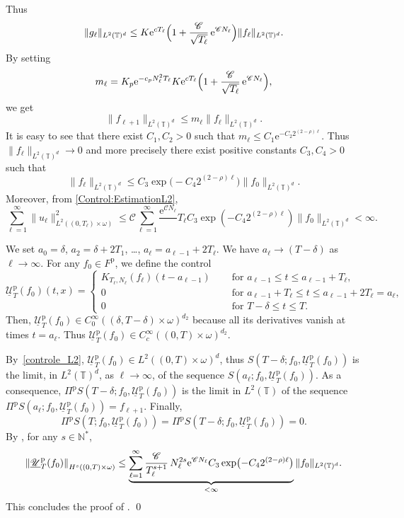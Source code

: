 \documentclass[JEP,XML,SOM,Unicode,NoEqCountersInSection]{cedram}
\let\mathcal\mathscr
\theoremstyle{plain}
\theoremstyle{definition}
\theoremstyle{remark}
\newcommand{\set}{\mathbb}
\newcommand{\T}{\set{T}}
\newcommand{\p}{{\mathrm p}}
\newcommand{\eu}{\mathrm e}
\let\originalleft\left
\let\originalright\right
\renewcommand{\left}{\mathopen{}\mathclose\bgroup\originalleft}
\renewcommand{\right}{\aftergroup\egroup\originalright}
\begin{document}
Thus
\[
\|g_\ell\|_{L^2(\T)^d} \leq K \eu^{cT_\ell} \Bigl(1 + \frac{\mathcal{C}}{\sqrt{T_\ell}}\, \eu^{\mathcal{C} N_\ell}\Bigr)
\|f_\ell\|_{L^2(\T)^d}.
\]
By setting
\[
m_\ell = K_p \eu^{- c_p N_\ell^2 T_\ell} K \eu^{cT_\ell} \Bigl(1 + \frac{\mathcal{C}}{\sqrt{T_\ell}}\, \eu^{\mathcal{C} N_\ell}\Bigr),
\]
we get
\[
\|f_{\ell+1}\|_{L^2(\T)^d} \leq m_\ell \|f_\ell \|_{L^2(\T)^d}.
\]
It is easy to see that there exist $C_1, C_2>0$ such that $m_\ell \leq C_1 \eu^{-C_2 2^{(2-\rho)\ell}}$. Thus $\|f_\ell\|_{L^2(\T)^d} \to 0$ and more precisely there exist positive constants $C_3, C_4>0$ such that
\[
\|f_\ell\|_{L^2(\T)^d} \leq C_3 \exp \bigl(-C_4 2^{(2-\rho)\ell} \bigr) \|f_0\|_{L^2(\T)^d}.
\]
Moreover, from \eqref{Control:EstimationL2},
\begin{equation}\label{controle_L2}
\sum_{\ell=1}^\infty \| u_\ell \|_{L^2((0,T_\ell)\times\omega)}^2 \leq
\mathcal{C} \sum_{\ell=1}^\infty \frac{\eu^{\mathcal{C}N_\ell}}\,{T_\ell} C_3 \exp(-C_4 2^{(2-\rho)\ell}) \|f_0\|_{L^2(\T)^d} <\infty.
\end{equation}

We set $a_0=\delta$, $a_2=\delta+2T_1$, \ldots, $a_\ell=a_{\ell-1}+2T_\ell$. We have $a_\ell \to (T-\delta)$ as $\ell \to \infty$. For any $f_0 \in F^\p$, we define the control
\[
\underline{\mathcal{U}}_T^{\p}(f_0)(t,x)=\begin{cases}
K_{T_\ell,N_\ell}(f_\ell)(t-a_{\ell-1})\quad & \text{ for } a_{\ell-1}\leq t \leq a_{\ell-1}+T_\ell, \\
0 & \text{ for } a_{\ell-1}+T_\ell\leq t \leq a_{\ell-1}+2T_\ell=a_{\ell},
\\
0 & \text{ for } T-\delta \leq t \leq T.
\end{cases}
\]
Then, $\underline{\mathcal{U}}_T^{\p}(f_0) \in C^\infty_0((\delta,T-\delta)\times \omega)^{d_2}$ because all its derivatives vanish at times $t=a_\ell$. Thus $\underline{\mathcal{U}}_T^{\p}(f_0) \in C^\infty_c((0,T)\times\omega)^{d_2}$.

By~\eqref{controle_L2}, $\underline{\mathcal{U}}_T^{\p}(f_0) \in L^2((0,T)\times\omega)^d$, thus
$S(T-\delta;f_0,\underline{\mathcal{U}}_T^{\p}(f_0))$ is the limit, in $L^2(\T)^d$, as $\ell \to \infty$, of the sequence $S(a_\ell;f_0,\underline{\mathcal{U}}_T^{\p}(f_0))$. As a consequence,
\hbox{$\Pi^\p S(T-\delta;f_0,\underline{\mathcal{U}}_T^{\p}(f_0))$} is the limit in $L^2(\T)$ of the sequence $\Pi^\p S(a_\ell;f_0,\underline{\mathcal{U}}_T^{\p}(f_0))=f_{\ell+1}$.
Finally,
\[
\Pi^\p S(T;f_0,\underline{\mathcal{U}}_T^{\p}(f_0))=\Pi^\p S(T-\delta;f_0,\underline{\mathcal{U}}_T^{\p}(f_0))=0.
\]
By , for any $s\in\mathbb{N}^*$,
\[
\left\| \underline{\mathcal{U}}_T^{\p}(f_0) \right\|_{H^s((0,T)\times\omega)}
\leq \underbrace{\sum_{\ell=1}^\infty \frac{\mathcal{C}}{T_\ell^{s+1}}\, N_\ell^{2s} \eu^{\mathcal{C} N_\ell} C_3 \exp \bigl(-C_4 2^{(2-\rho)\ell} \bigr)}_{< \infty}
\|f_0\|_{L^2(\T)^d}.
\]
This concludes the proof of . \qed
\end{document}
